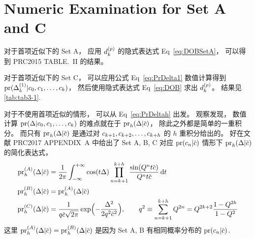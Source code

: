 
\section{Numeric Examination for Set A and C}
对于首项近似下的 Set A，
应用 $d_k^{(p)}$ 的隐式表达式 Eq~\eqref{eq:DOBSetA}，
可以得到 PRC2015 TABLE.~II 的结果。

对于首项近似下的 Set C，
可以应用公式 Eq~\eqref{eq:PrDelta1} 数值计算得到 $\textrm{pr}(\Delta_k^{(1)}|
c_0,c_1,\ldots,c_k)$，
然后使用隐式表达式 Eq~\eqref{eq:DOB} 求出 $d_k^{(p)}$。
结果见 \autoref{tab:tab3-1}.

对于不使用首项近似的情形，
可以从 Eq~\eqref{eq:PrDeltah} 出发。
观察发现，
数值计算 $\textrm{pr}(\Delta|c_0,c_1,\ldots,c_k)$ 的难点就在于
$\dmspr_h(\Delta|\dmscbar)$，
除此之外都是简单的一重积分。
而只有 $\dmspr_h(\Delta|\dmscbar)$ 是通过对 $c_{k+1},c_{k+2},\ldots,c_{k+h}$ 的 $h$ 重积分给出的。
好在文献 PRC2017 APPENDIX~A 中给出了 Set A, B, C 对应 $\dmspr(c_n|\dmscbar)$
情形下 $\dmspr_h(\Delta|\dmscbar)$ 的简化表达式，
\begin{equation}
  \label{eq:PrhABC}
  \begin{aligned}
    \dmspr_h^{(A)}(\Delta|\dmscbar) &=
    \frac{1}{2\pi}\int_{-\infty}^{+\infty}
    \cos(t\Delta) \prod_{n=k+1}^{k+h}
    \frac{\sin( Q^nt\dmscbar)}{ Q^nt\dmscbar}\dmsdif t\\
    \dmspr_h^{(B)}(\Delta|\dmscbar) &= \dmspr_h^{(A)}(\Delta|\dmscbar) \\
    \dmspr_h^{(C)}(\Delta|\dmscbar) &=
    \frac{1}{q\dmscbar\sqrt{2\pi}}\exp\Bigl(- \frac{
        \Delta^2}{2q^2\dmscbar^2}\Bigr),
    \qquad q^2\equiv\sum_{n=k+1}^{k+h}Q^{2n}
    = Q^{2k+2} \frac{1-Q^{2h}}{1-Q^2}
  \end{aligned}
\end{equation}
这里 $\dmspr_h^{(A)}(\Delta|\dmscbar)=\dmspr_h^{(B)}(\Delta|\dmscbar)$
是因为 Set A, B 有相同概率分布的 $\dmspr(c_n|\dmscbar)$.

